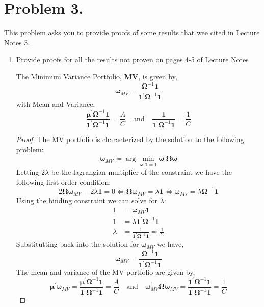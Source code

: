\documentclass[12pt,twoside]{article}
\begin{document}
\newpage

\section{Problem 3.}
This problem asks you to provide proofs of some results that wee cited in Lecture Notes 3.

\begin{enumerate}
    \item Provide proofs for all the results not proven on pages 4-5 of Lecture Notes
    \begin{solution}
        \setcounter{result}{1}
        \begin{result} 
            The Minimum Variance Portfolio, \textbf{MV}, is given by,
            \[
                \mathbf\omega_{MV} = \frac{\mathbf\Omega^{-1}\mathbf 1}{\mathbf 1^\prime\mathbf\Omega^{-1}\mathbf 1}
            \]
            with Mean and Variance,
            \[
                \frac{\mathbf{\mu}^\prime\mathbf{\Omega}^{-1}\mathbf{1}}{\mathbf{1}^\prime\mathbf{\Omega}^{-1}\mathbf{1}} = \frac{A}{C} \quad \text{and} \quad \frac{\mathbf{1}}{\mathbf{1}^\prime\mathbf{\Omega}^{-1}\mathbf{1}} = \frac{1}{C}
            \]
        \end{result}
        \begin{proof}
            The MV portfolio is characterized by the solution to the following problem:
            \[
                \mathbf\omega_{MV} \coloneqq \arg\min_{\mathbf\omega^\prime\mathbf 1 = 1} \mathbf\omega^\prime\mathbf\Omega\mathbf\omega
            \]
            Letting \(2\lambda\) be the lagrangian multiplier of the constraint we have the following first order condition:
            \[
                2\mathbf\Omega\mathbf\omega_{MV} - 2\lambda\mathbf 1 = 0 \iff \mathbf\Omega\mathbf\omega_{MV} = \lambda\mathbf 1 \iff \mathbf\omega_{MV} = \lambda\mathbf\Omega^{-1}\mathbf 1
            \]
            Using the binding constraint we can solve for \(\lambda\):
            \begin{align*}
                1 & = \mathbf\omega_{MV}\mathbf 1 \\ 
                1 & = \lambda \mathbf 1^\prime \mathbf \Omega^{-1} \mathbf 1 \\
                \lambda & = \frac{1}{\mathbf 1^\prime \mathbf \Omega^{-1} \mathbf 1} \eqqcolon \frac{1}{C}
            \end{align*}
            Substitutting back into the solution for \(\mathbf\omega_{MV}\) we have,
            \[
                \mathbf\omega_{MV} = \frac{\mathbf\Omega^{-1}\mathbf 1}{\mathbf 1^\prime \mathbf \Omega^{-1} \mathbf 1}
            \]
            The mean and variance of the MV portfolio are given by,
            \[
                \mathbf \mu^\prime \mathbf\omega_{MV}  = \frac{\mathbf\mu^\prime\mathbf\Omega^{-1}\mathbf 1}{\mathbf 1^\prime \mathbf \Omega^{-1} \mathbf 1} = \frac{A}{C} \quad \text{and} \quad \mathbf\omega_{MV}^\prime \mathbf \Omega \mathbf\omega_{MV} = \frac{\mathbf 1^\prime \mathbf \Omega^{-1} \mathbf 1}{\mathbf 1^\prime \mathbf \Omega^{-1} \mathbf 1} = \frac{1}{C}
            \]
        \end{proof}


\end{solution}
\end{enumerate}
\end{document}
